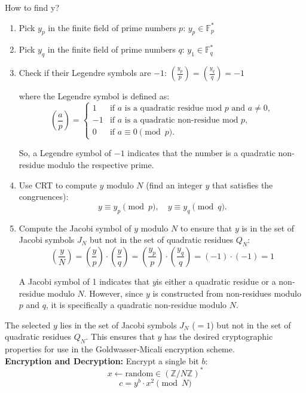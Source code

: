 How to find y?
\begin{enumerate}
    \item Pick $y_p$ in the finite field of prime numbers $p$: $y_p \in \mathbb{F}_p^*$
    \item Pick $y_q$ in the finite field of prime numbers $q$: $y_1 \in \mathbb{F}_q^*$
    \item Check if their Legendre symbols are $-1$: $\left(\frac{y_p}{p}\right) = \left(\frac{y_q}{q}\right) = -1$
    
    where the Legendre symbol is defined as:
    \[
    \left(\frac{a}{p}\right) =
    \begin{cases} 
    1 & \text{if } a \text{ is a quadratic residue mod } p \text{ and } a \neq 0, \\
    -1 & \text{if } a \text{ is a quadratic non-residue mod } p, \\
    0 & \text{if } a \equiv 0 \pmod{p}.
    \end{cases} \]
    
    So, a Legendre symbol of $-1$ indicates that the number is a quadratic non-residue modulo the respective prime.
    \item Use CRT to compute \( y \) modulo \( N \) (find an integer $y$ that satisfies the congruences): 
    \[
    y \equiv y_p \pmod{p}, \quad y \equiv y_q \pmod{q}.
    \]


    \item Compute the Jacobi symbol of \( y \) modulo \( N \) to ensure that \( y \) is in the set of Jacobi symbols \( J_N \) but not in the set of quadratic residues \( Q_N \):
    \[ \left(\frac{y}{N}\right) = \left(\frac{y}{p}\right) \cdot \left(\frac{y}{q}\right) =
    \left(\frac{y_p}{p}\right) \cdot \left(\frac{y_q}{q}\right) = (-1)\cdot(-1) = 1\] 

    A Jacobi symbol of 1 indicates that $y$is either a quadratic residue or a non-residue modulo $N$.
    However, since $y$ is constructed from non-residues modulo $p$ and $q$, it is specifically a quadratic non-residue modulo $N$.
\end{enumerate}

The selected \( y \) lies in the set of Jacobi symbols \( J_N \) ($=1$) but not in the set of quadratic residues \( Q_N \). 
This ensures that \( y \) has the desired cryptographic properties for use in the Goldwasser-Micali encryption scheme. \\

\textbf{Encryption and Decryption:}
Encrypt a single bit $b$:
\[ x \leftarrow \text{random} \in (\mathbb{Z}/N\mathbb{Z})^* \]
\[ c = y^b \cdot x^2\pmod{N} \]

